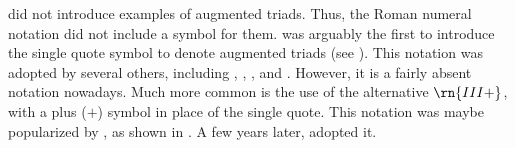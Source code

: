 
\textcite{weber1817versuch} did not introduce examples of
augmented triads. Thus, the Roman numeral notation did not
include a symbol for them. \textcite{richter1860lehrbuch} was arguably the first to
introduce the single quote symbol to denote augmented triads
(see ). This
notation was adopted by several others, including
\textcite{jadassohn1883lehrbuch},
\textcite{broekhoven1889system}, \textcite{buwa1893schule},
and \textcite{shepard1896harmony}. However, it is a fairly
absent notation nowadays. Much more common is the use of the
alternative $\rn{III+}$, with a plus ($+$) symbol in place
of the single quote. This notation was maybe popularized by
\textcite{riemann1890katechismus}, as shown in
. A few
years later, \textcite{chadwick1897harmony} adopted it. 


